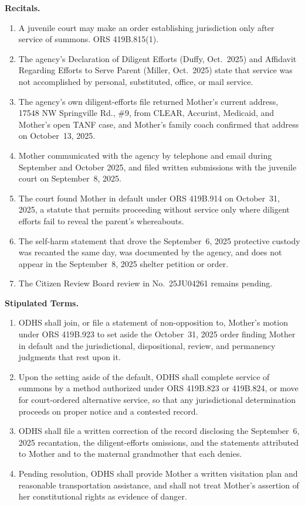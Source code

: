 \documentclass[10pt,a4paper,roman]{moderncv}
\begin{document}
\begin{enumerate}[leftmargin=*,itemsep=0.35em,topsep=0.3em,resume]
\vspace{0.75em}
\textbf{Recitals.}
\begin{enumerate}[label=\Alph*., leftmargin=*,itemsep=0.35em]
	\item A juvenile court may make an order establishing jurisdiction only after service of summons. ORS 419B.815(1).
	\item The agency's Declaration of Diligent Efforts (Duffy, Oct.~2025) and Affidavit Regarding Efforts to Serve Parent (Miller, Oct.~2025) state that service was not accomplished by personal, substituted, office, or mail service.
	\item The agency's own diligent-efforts file returned Mother's current address, 17548 NW Springville Rd., \#9, from CLEAR, Accurint, Medicaid, and Mother's open TANF case, and Mother's family coach confirmed that address on October~13, 2025.
	\item Mother communicated with the agency by telephone and email during September and October 2025, and filed written submissions with the juvenile court on September~8, 2025.
	\item The court found Mother in default under ORS 419B.914 on October~31, 2025, a statute that permits proceeding without service only where diligent efforts fail to reveal the parent's whereabouts.
	\item The self-harm statement that drove the September~6, 2025 protective custody was recanted the same day, was documented by the agency, and does not appear in the September~8, 2025 shelter petition or order.
	\item The Citizen Review Board review in No.~25JU04261 remains pending.
\end{enumerate}

\vspace{0.5em}
\textbf{Stipulated Terms.}
\begin{enumerate}[label=\arabic*., leftmargin=*,itemsep=0.35em]
	\item ODHS shall join, or file a statement of non-opposition to, Mother's motion under ORS 419B.923 to set aside the October~31, 2025 order finding Mother in default and the jurisdictional, dispositional, review, and permanency judgments that rest upon it.
	\item Upon the setting aside of the default, ODHS shall complete service of summons by a method authorized under ORS 419B.823 or 419B.824, or move for court-ordered alternative service, so that any jurisdictional determination proceeds on proper notice and a contested record.
	\item ODHS shall file a written correction of the record disclosing the September~6, 2025 recantation, the diligent-efforts omissions, and the statements attributed to Mother and to the maternal grandmother that each denies.
	\item Pending resolution, ODHS shall provide Mother a written visitation plan and reasonable transportation assistance, and shall not treat Mother's assertion of her constitutional rights as evidence of danger.
\end{enumerate}


\end{enumerate}
\end{document}

